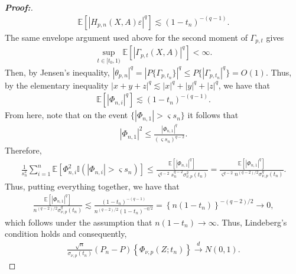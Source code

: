 \documentclass[10pt,a4paper]{amsart}
\begin{document}
\begin{proof}[\textbf{Proof:}]
\begin{align*}
    \mathbb{E}\left[ \left| H_{p,n}(X,A)\varepsilon \right|^q \right] \lesssim
    (1-t_n)^{-(q-1)}.
\end{align*}
The same envelope argument used above for the second moment of
$\Gamma_{p,t}$ gives
\begin{align*}
    \sup_{t\in[t_0,1)} \mathbb{E} \left[ \left| \Gamma_{p,t}(X,A) \right|^q \right] <\infty.
\end{align*}
Then, by Jensen's inequality, $|\theta_{p,n}|^q = |P\{\Gamma_{p,t_n}\}|^q \leq P \{|\Gamma_{p,t_n}|^q \} = O(1)$. Thus, by the elementary inequality $|x+y+z|^q\lesssim |x|^q+|y|^q+|z|^q$, we have that
\begin{align*}
       \mathbb{E}\left[ |\Phi_{n,i}|^q \right] \lesssim (1-t_n)^{-(q-1)}.
\end{align*}
From here, note that on the event $\{|\Phi_{n,1}|> \varsigma s_n\}$ it follows that
\begin{align*}
    |\Phi_{n,1}|^2 \leq \frac{ |\Phi_{n,1}|^q }{(\varsigma s_n)^{q-2}}.
\end{align*}
Therefore,
\begin{align*}
    \frac{1}{s_n^2} \sum_{i=1}^{n} \mathbb{E}\!\left[ \Phi_{n,i}^2 \mathbb{I}\!\left( |\Phi_{n,i}|>\varsigma s_n \right) \right] \leq  \frac{ \mathbb{E}\left[ |\Phi_{n,1}|^q \right]}{\varsigma^{q-2}s_n^{q-2} \sigma_{\nu,p}^2(t_n)} =  \frac{ \mathbb{E}\left[ |\Phi_{n,1}|^q \right]}{ \varsigma^{q-2} n^{(q-2)/2} \sigma_{\nu,p}^q(t_n)}.
\end{align*}
Thus, putting everything together, we have that
\begin{align*}
    \frac{ \mathbb{E}\left[ |\Phi_{n,1}|^q \right]}{ n^{(q-2)/2} \sigma_{\nu,p}^q(t_n)} \lesssim \frac{ (1-t_n)^{-(q-1)} }{ n^{(q-2)/2} (1-t_n)^{-q/2} } = \left\{ n(1-t_n) \right\}^{-(q-2)/2} \longrightarrow 0,
\end{align*}
which follows under the assumption that $n(1-t_n) \to \infty$. Thus, Lindeberg's condition holds and consequently,
\begin{align*}
     \frac{\sqrt{n}}{\sigma_{\nu,p}(t_n)} (P_n-P) \left\{ \Phi_{\nu,p}(Z;t_n) \right\} \overset{d}{\longrightarrow} N(0,1).
\end{align*}


\medskip 


\end{proof}
\end{document}
